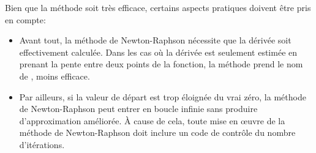 \medskip
Bien que la méthode soit très efficace, certains aspects pratiques doivent être pris en compte: 
\begin{itemize}
  \item Avant tout, la méthode de Newton-Raphson nécessite que la dérivée soit effectivement calculée. 
	Dans les cas où la dérivée est seulement estimée en prenant la pente entre deux points de la fonction, la méthode prend le nom de , moins efficace.
  \item Par ailleurs, si la valeur de départ est trop éloignée du vrai zéro, la méthode de Newton-Raphson peut entrer en boucle infinie sans produire d'approximation améliorée. 
	À cause de cela, toute mise en œuvre de la méthode de Newton-Raphson doit inclure un code de contrôle du nombre d'itérations.
\end{itemize}


